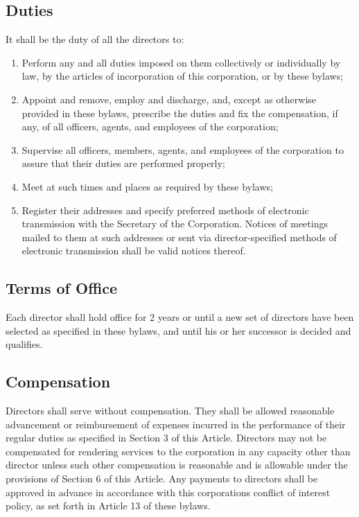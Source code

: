 \documentclass{article}
\begin{document}
	\subsection{Duties}
	It shall be the duty of all the directors to:
	\begin{enumerate}[\indent (a)]
		\item Perform any and all duties imposed on them collectively or individually by law, by the articles of incorporation of this corporation, or by these bylaws;
		\item Appoint and remove, employ and discharge, and, except as otherwise provided in these bylaws, prescribe the duties and fix the compensation, if any, of all officers, agents, and employees of the corporation;
		\item Supervise all officers, members, agents, and employees of the corporation to assure that their duties are performed properly;
		\item Meet at such times and places as required by these bylaws;
		\item Register their addresses and specify preferred methods of electronic transmission with the Secretary of the Corporation. Notices of meetings mailed to them at such addresses or sent via director-specified methods of electronic transmission shall be valid notices thereof. %
	\end{enumerate}
	
	\subsection{Terms of Office}
	Each director shall hold office for 2 years or until a new set of directors have been selected as specified in these bylaws, and until his or her successor is decided and qualifies.
	\subsection{Compensation}
	Directors shall serve without compensation. They shall be allowed reasonable advancement or reimbursement of expenses incurred in the performance of their regular duties as specified in Section 3 of this Article. Directors may not be compensated for rendering services to the corporation in any capacity other than director unless such other compensation is reasonable and is allowable under the provisions of Section 6 of this Article. Any payments to directors shall be approved in advance in accordance with this corporation\textquotesingle s conflict of interest policy, as set forth in Article 13 of these bylaws.
\end{document}
